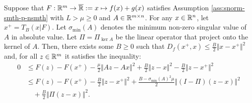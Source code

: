 \documentclass[12pt]{article}
\begin{document}
            \begin{theorem}\label{thm:pg-ineq-semi-scnvx}
                Suppose that $F:\mathbb R^m \rightarrow \overline {\mathbb R} := x \mapsto f(x) + g(x)$ satisfies Assumption \ref{ass:snorm-smth-p-nsmth} with $L > \mu \ge 0$ and $A \in \mathbb R^{m\times n}$. 
                For any $x \in \mathbb R^n$, let $x^+ = T_B(x | F)$. 
                Let $\sigma_{\min}(A)$ denotes the minimum non-zero singular value of $A$ in absolute value. 
                Let $\Pi = \Pi_{\ker A}$ be the linear operator that project onto the kernel of $A$. 
                Then, there exists some $B \ge 0$ such that $D_f(x^+, x) \le \frac{B}{2}\Vert x - x^+\Vert^2$ and, for all $z \in \mathbb R^m$ it satisfies the inequality: 
                \begin{align*}
                    0 &\le F(z) - F(x^+) 
                    - \frac{\mu}{2}\Vert Az - Ax\Vert^2 
                    + \frac{B}{2}\Vert z - x\Vert^2
                    - \frac{B}{2}\Vert z - x^+\Vert^2
                    \\
                    &\le F(z) - F(x^+)
                    - \frac{B}{2}\Vert z - x^+\Vert^2 
                    + \frac{B - \sigma_{\min}(A)^2\mu}{2}\Vert (I - \Pi)(z - x) \Vert^2
                        \\ &\quad 
                        + \frac{B}{2}\Vert \Pi(z - x)\Vert^2. 
                \end{align*}
            \end{theorem}
\end{document}
